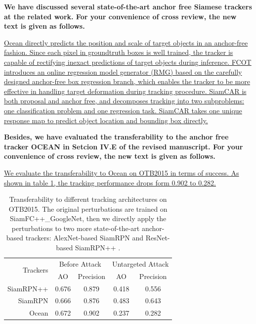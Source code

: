 \documentclass[12pt]{article}
\begin{document}
\textbf{We have discussed several state-of-the-art anchor free Siamese trackers at the related work. For your convenience of cross review, the new text is given as follows.}

\uline{
Ocean \cite{zhang2020ocean} directly predicts the position and scale of target objects in an anchor-free fashion. Since each pixel in groundtruth boxes is well trained, the tracker is capable of rectifying inexact predictions of target objects during inference.
FCOT \cite{cui2020fully} introduces an online regression model generator (RMG) based on the carefully designed anchor-free box regression branch, which enables the tracker to be more effective in handling target deformation during tracking procedure.
SiamCAR \cite{9157720} is both proposal and anchor free, and decomposes tracking into two subproblems: one classification problem and one regression task. SiamCAR takes one unique response map to predict object location and bounding box directly.
}

\textbf{Besides, we have evaluated the transferability to the anchor free tracker OCEAN in Setcion IV.E of the revised manuscript. For your convenience of cross review, the new text is given as follows.}

\uline{We evaluate the transferability to Ocean on OTB2015 in terms of success. As shown in table \ref{tab:arch}, the tracking performance drops form 0.902 to 0.282.}

\begin{table}[t!]
  \centering
  \caption{Transferability to different tracking architectures on OTB2015. The original perturbations are trained on SiamFC++\_GoogleNet, then we directly apply the perturbations to two more state-of-the-art anchor-based trackers: AlexNet-based SiamRPN \cite{SiamRPN} and ResNet-based SiamRPN++ \cite{SiamRPN++}.}
  \begin{tabular}{rcccc} 
  \toprule
  \multirow{2}{*}[-2pt]{Trackers} & \multicolumn{2}{c}{Before Attack} & \multicolumn{2}{c}{Untargeted Attack}  \\
  \cmidrule{2-5}
                            & AO & Precision              & AO    & Precision \\ \midrule
  SiamRPN++                 & 0.676   & 0.879             & 0.418 & 0.556     \\
  SiamRPN                   & 0.666   & 0.876             & 0.483 & 0.643     \\
  Ocean                     & 0.672   & 0.902             & 0.237 & 0.282     \\ \bottomrule
  \end{tabular}
  \label{tab:arch}
\end{table}
\end{document}
